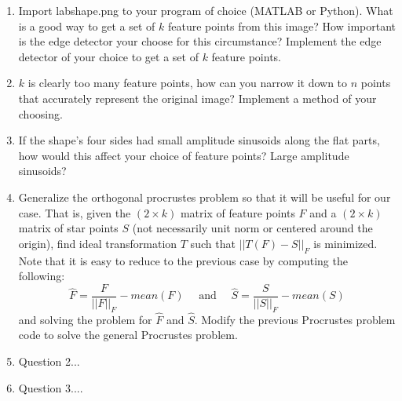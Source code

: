 \documentclass[paper=a4, fontsize=11pt]{scrartcl} %
\begin{document}
\begin{enumerate}
  \item
  Import labshape.png to your program of choice (MATLAB or Python). What is a good way to get a set of $k$ feature points from this image? How important is the edge detector your choose for this circumstance? Implement the edge detector of your choice to get a set of $k$ feature points. 
  \item 
  $k$ is clearly too many feature points, how can you narrow it down to $n$ points that accurately represent the original image? Implement a method of your choosing. 
  \item
  If the shape's four sides had small amplitude sinusoids along the flat parts, how would this affect your choice of feature points? Large amplitude sinusoids? 
  \item
  Generalize the orthogonal procrustes problem so that it will be useful for our case. That is, given the $(2\times k)$ matrix of feature points $F$ and a  $(2\times k)$ matrix of star points $S$ (not necessarily unit norm or centered around the origin), find ideal transformation $T$ such that $||T(F)-S||_F$ is minimized.  Note that it is easy to reduce to the previous case by computing the following:
  $$
  \hat{F} = \frac{F}{||F||_F} - mean(F)\quad\textrm{ and }\quad\hat{S} = \frac{S}{||S||_F} - mean(S)
  $$
  and solving the problem for $\hat{F}$ and $\hat{S}$. Modify the previous Procrustes problem code to solve the general Procrustes problem.
  \item Question 2...
  \item Question 3....
\end{enumerate}
\end{document}
